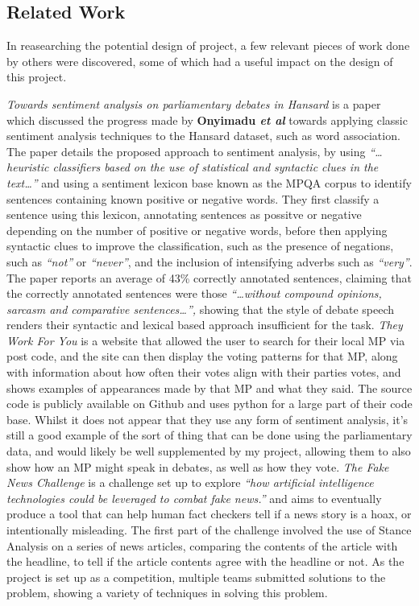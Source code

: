\subsection{Related Work}
\label{sec:bck_related}
In reasearching the potential design of project, a few relevant pieces of work done by others were discovered, some of which had a useful impact on the design of this project. 

\emph{Towards sentiment analysis on parliamentary debates in Hansard}\cite{Onyimadu2014} is a paper which discussed the progress made by \textbf{Onyimadu \emph{et al}} towards applying classic sentiment analysis techniques to the Hansard dataset, such as word association. The paper details the proposed approach to sentiment analysis, by using \emph{“…heuristic classifiers based on the use of statistical and syntactic clues in the text…”} and using a sentiment lexicon base known as the MPQA corpus to identify sentences containing known positive or negative words. They first classify a sentence using this lexicon, annotating sentences as possitve or negative depending on the number of positive or negative words, before then applying syntactic clues to improve the classification, such as the presence of negations, such as \emph{“not”} or \emph{“never”}, and the inclusion of intensifying adverbs such as \emph{“very”}. The paper reports an average of 43\% correctly annotated sentences, claiming that the correctly annotated sentences were those \emph{“…without compound opinions, sarcasm and comparative sentences…”,} showing that the style of debate speech renders their syntactic and lexical based approach insufficient for the task.
\emph{They Work For You}\cite{mySociety} is a website that allowed the user to search for their local MP via post code, and the site can then display the voting patterns for that MP, along with information about how often their votes align with their parties votes, and shows examples of appearances made by that MP and what they said. The source code is publicly available on Github and uses python for a large part of their code base. Whilst it does not appear that they use any form of sentiment analysis, it’s still a good example of the sort of thing that can be done using the parliamentary data, and would likely be well supplemented by my project, allowing them to also show how an MP might speak in debates, as well as how they vote.
\emph{The Fake News Challenge}\cite{FakeNewsChallenge2017} is a challenge set up to explore \emph{“how artificial intelligence technologies could be leveraged to combat fake news.”} and aims to eventually produce a tool that can help human fact checkers tell if a news story is a hoax, or intentionally misleading. The first part of the challenge involved the use of Stance Analysis on a series of news articles, comparing the contents of the article with the headline, to tell if the article contents agree with the headline or not. As the project is set up as a competition, multiple teams submitted solutions to the problem, showing a variety of techniques in solving this problem. 
